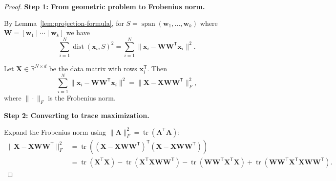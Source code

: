 \begin{proof}
  \textbf{Step 1: From geometric problem to Frobenius norm.}

  By Lemma~\ref{lem:projection-formula}, for $S = \operatorname{span}(\mathbf{w}_1,\dots,\mathbf{w}_k)$ where $\mathbf{W} = [\mathbf{w}_1 \mid \cdots \mid \mathbf{w}_k]$ we have
  \[
    \sum_{i=1}^{N} \operatorname{dist}(\mathbf{x}_i, S)^2 = \sum_{i=1}^{N} \|\mathbf{x}_i - \mathbf{W}\mathbf{W}^{\mathsf{T}}\mathbf{x}_i\|^2.
  \]

  Let $\mathbf{X} \in \mathbb{R}^{N \times d}$ be the data matrix with rows $\mathbf{x}_i^{\mathsf{T}}$. Then
  \[
    \sum_{i=1}^{N} \|\mathbf{x}_i - \mathbf{W}\mathbf{W}^{\mathsf{T}}\mathbf{x}_i\|^2 = \|\mathbf{X} - \mathbf{X}\mathbf{W}\mathbf{W}^{\mathsf{T}}\|_F^2,
  \]
  where $\|\cdot\|_F$ is the Frobenius norm.

  \textbf{Step 2: Converting to trace maximization.}

  Expand the Frobenius norm using $\|\mathbf{A}\|_F^2 = \operatorname{tr}(\mathbf{A}^{\mathsf{T}}\mathbf{A})$:
  \begin{align*}
    \|\mathbf{X} - \mathbf{X}\mathbf{W}\mathbf{W}^{\mathsf{T}}\|_F^2
     & = \operatorname{tr}\left((\mathbf{X} - \mathbf{X}\mathbf{W}\mathbf{W}^{\mathsf{T}})^{\mathsf{T}}(\mathbf{X} - \mathbf{X}\mathbf{W}\mathbf{W}^{\mathsf{T}})\right)                                                                                                                                                                                                \\
     & = \operatorname{tr}(\mathbf{X}^{\mathsf{T}}\mathbf{X}) - \operatorname{tr}(\mathbf{X}^{\mathsf{T}}\mathbf{X}\mathbf{W}\mathbf{W}^{\mathsf{T}}) - \operatorname{tr}(\mathbf{W}\mathbf{W}^{\mathsf{T}}\mathbf{X}^{\mathsf{T}}\mathbf{X}) + \operatorname{tr}(\mathbf{W}\mathbf{W}^{\mathsf{T}}\mathbf{X}^{\mathsf{T}}\mathbf{X}\mathbf{W}\mathbf{W}^{\mathsf{T}}).
  \end{align*}


\end{proof}
